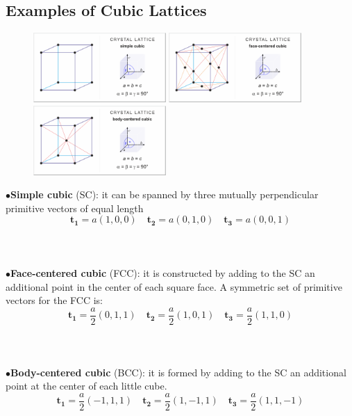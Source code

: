 \documentclass[10.75pt,a4paper,openright,bottom=2cm]{article}
\renewcommand{\Vec}[1]{\boldsymbol{#1}}
\begin{document}
\subsection{Examples of Cubic Lattices}
\begin{figure}
    \vspace{-0.75cm}
    \includegraphics[width=0.45\textwidth]{simple_cubic_lattice.png}
    \includegraphics[width=0.45\textwidth]{face-centered_cubic_lattice.png}
    \includegraphics[width=0.45\textwidth]{body-centered_cubic_lattice.png}
    \end{figure}
    $\bullet$\;\textbf{Simple cubic} (SC): it can be spanned by three mutually perpendicular primitive vectors of equal length
    \[
    \Vec{t_1}=a(1,0,0) \quad \Vec{t_2}=a(0,1,0) \quad \Vec{
    t_3}=a(0,0,1)
    \]\\\\\\
    $\bullet$\;\textbf{Face-centered cubic} (FCC): it is constructed by adding to the SC an additional point in the center of each square face. A symmetric set of primitive vectors for the FCC is:
    \[
    \Vec{t_1}=\frac{a}{2}(0,1,1) \quad \Vec{t_2}=\frac{a}{2}(1,0,1) \quad \Vec{t_3}=\frac{a}{2}(1,1,0)
    \]\\\\\\
    $\bullet$\;\textbf{Body-centered cubic} (BCC): it is formed by adding to the SC an additional point at the center of each little cube.
    \[
    \Vec{t_1}=\frac{a}{2}(-1,1,1) \quad \Vec{t_2}=\frac{a}{2}(1,-1,1) \quad \Vec{t_3}=\frac{a}{2}(1,1,-1)
    \]
\newline
\end{document}
